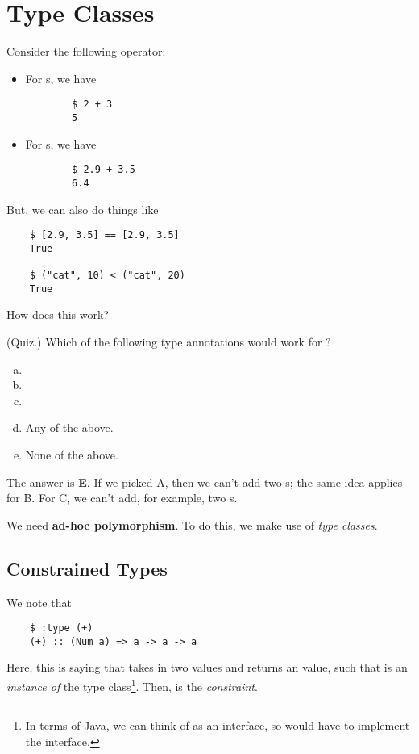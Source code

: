 \documentclass[letterpaper]{article}
\begin{document}
\section{Type Classes}
Consider the following operator: \code{+}
\begin{itemize}
    \item For s, we have 
    \begin{verbatim}
        $ 2 + 3
        5\end{verbatim}
    \item For s, we have 
    \begin{verbatim}
        $ 2.9 + 3.5
        6.4 \end{verbatim}
\end{itemize}
But, we can also do things like 
\begin{verbatim}
    $ [2.9, 3.5] == [2.9, 3.5]
    True

    $ ("cat", 10) < ("cat", 20)
    True \end{verbatim}
How does this work? 

\begin{mdframed}[]
    (Quiz.) Which of the following type annotations would work for \code{(+)}?

    \begin{enumerate}[(a)]
        \item {}
        \item {}
        \item {}
        \item Any of the above. 
        \item None of the above.
    \end{enumerate}

    \begin{mdframed}[]
        The answer is \textbf{E}. If we picked A, then we can't add two s; the same idea applies for B. For C, we can't add, for example, two s.
    \end{mdframed}
\end{mdframed}
We need \textbf{ad-hoc polymorphism}. To do this, we make use of \emph{type classes}.




\subsection{Constrained Types}
We note that 
\begin{verbatim}
    $ :type (+)
    (+) :: (Num a) => a -> a -> a\end{verbatim}
Here, this is saying that \code{(+)} takes in two  values and returns an  value, such that  is an \emph{instance of} the  type class\footnote{In terms of Java, we can think of  as an interface, so  would have to implement the  interface.}. Then,  is the \emph{constraint}.
\end{document}
